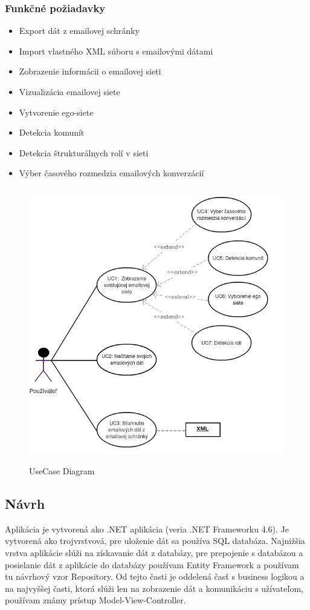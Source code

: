 \documentclass[slovak,master,public,dept460,male,cpdeclaration,oneside]{diploma}
\begin{document}
\subsubsection{Funkčné požiadavky}
\begin{itemize}
\item Export dát z emailovej schránky
\item Import vlastného XML súboru s emailovými dátami
\item Zobrazenie informácii o emailovej sieti
\item Vizualizácia emailovej siete
\item Vytvorenie ego-siete
\item Detekcia komunít
\item Detekcia štrukturálnych rolí v sieti
\item Výber časového rozmedzia emailových konverzácií
\end{itemize}


\begin{figure}[H]
\centering
\includegraphics[width=12cm, height=12cm]{figures/diagram_usecase}
\caption{UseCase Diagram}
\end{figure}


\subsection{Návrh}
Aplikácia je vytvorená ako .NET aplikácia (veria .NET Frameworku 4.6). Je vytvorená ako trojvrstvová, pre uloženie dát sa používa SQL databáza. Najnižšia vrstva aplikácie slúži na získavanie dát z databázy, pre prepojenie s databázou a posielanie dát z aplikácie do databázy používam Entity Framework a používam tu návrhový vzor Repository. Od tejto časti je oddelená časť s business logikou a na najvyššej časti, ktorá slúži len na zobrazenie dát a komunikáciu s užívateľom, používam známy prístup Model-View-Controller.
\end{document}
